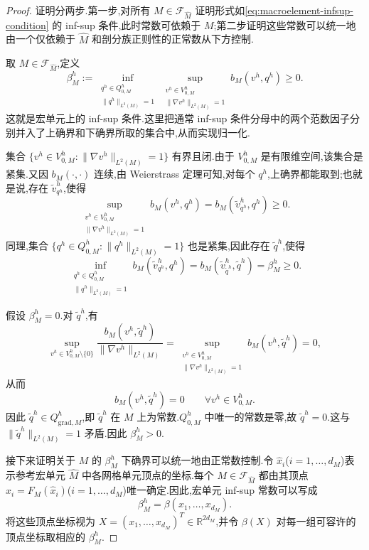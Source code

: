 \begin{proof}
证明分两步.第一步,对所有 $M\in\mathcal{F}_{\widehat M}$ 证明形式如\cref{eq:macroelement-infsup-condition} 的 inf-sup 条件,此时常数可依赖于 $M$;第二步证明这些常数可以统一地由一个仅依赖于 $\widehat M$ 和剖分族正则性的正常数从下方控制.

取 $M\in\mathcal{F}_{\widehat M}$,定义
\begin{equation}\label{eq:macroelement-infsup-constant}
  \beta_M^h:=
  \inf_{\substack{q^h\in Q_{0,M}^h\\
                   \|q^h\|_{L^2(M)}=1}}
  \sup_{\substack{v^h\in V_{0,M}^h\\
                   \|\nabla v^h\|_{L^2(M)}=1}}
    b_M(v^h,q^h)\ge0.
\end{equation}
这就是宏单元上的 inf-sup 条件.这里把通常 inf-sup 条件分母中的两个范数因子分别并入了上确界和下确界所取的集合中,从而实现归一化.

集合 $\{v^h\in V_{0,M}^h:\|\nabla v^h\|_{L^2(M)}=1\}$ 有界且闭.由于 $V_{0,M}^h$ 是有限维空间,该集合是紧集.又因 $b_M(\cdot,\cdot)$ 连续,由 Weierstrass 定理可知,对每个 $q^h$,上确界都能取到;也就是说,存在 $\widetilde v_{q^h}^h$,使得
\[
  \sup_{\substack{v^h\in V_{0,M}^h\\
                   \|\nabla v^h\|_{L^2(M)}=1}}
    b_M(v^h,q^h)
  =b_M(\widetilde v_{q^h}^h,q^h)\ge0.
\]
同理,集合 $\{q^h\in Q_{0,M}^h:\|q^h\|_{L^2(M)}=1\}$ 也是紧集,因此存在 $\widetilde q^h$,使得
\[
  \inf_{\substack{q^h\in Q_{0,M}^h\\
                   \|q^h\|_{L^2(M)}=1}}
    b_M(\widetilde v_{q^h}^h,q^h)
  =b_M(\widetilde v_{\widetilde q^h}^h,\widetilde q^h)
  =\beta_M^h\ge0.
\]

假设 $\beta_M^h=0$.对 $\widetilde q^h$,有
\[
  \sup_{v^h\in V_{0,M}^h\setminus\{0\}}
    \frac{b_M(v^h,\widetilde q^h)}
         {\|\nabla v^h\|_{L^2(M)}}
  =\sup_{\substack{v^h\in V_{0,M}^h\\
                    \|\nabla v^h\|_{L^2(M)}=1}}
    b_M(v^h,\widetilde q^h)=0,
\]
从而
\[
  b_M(v^h,\widetilde q^h)=0
  \qquad\forall v^h\in V_{0,M}^h.
\]
因此 $\widetilde q^h\in Q_{\mathrm{grad},M}^h$,即 $\widetilde q^h$ 在 $M$ 上为常数.$Q_{0,M}^h$ 中唯一的常数是零,故 $\widetilde q^h=0$.这与 $\|\widetilde q^h\|_{L^2(M)}=1$ 矛盾.因此 $\beta_M^h>0$.

接下来证明关于 $M$ 的 $\beta_M^h$ 下确界可以统一地由正常数控制.令 $\widehat x_i$($i=1,\ldots,d_M$)表示参考宏单元 $\widehat M$ 中各网格单元顶点的坐标.每个 $M\in\mathcal{F}_{\widehat M}$ 都由其顶点 $x_i=F_M(\widehat x_i)$($i=1,\ldots,d_M$)唯一确定.因此,宏单元 inf-sup 常数可以写成
\[
  \beta_M^h=\beta(x_1,\ldots,x_{d_M}).
\]
将这些顶点坐标视为 $X=(x_1,\ldots,x_{d_M})^T\in\mathbb{R}^{2d_M}$,并令 $\beta(X)$ 对每一组可容许的顶点坐标取相应的 $\beta_M^h$.


\end{proof}
